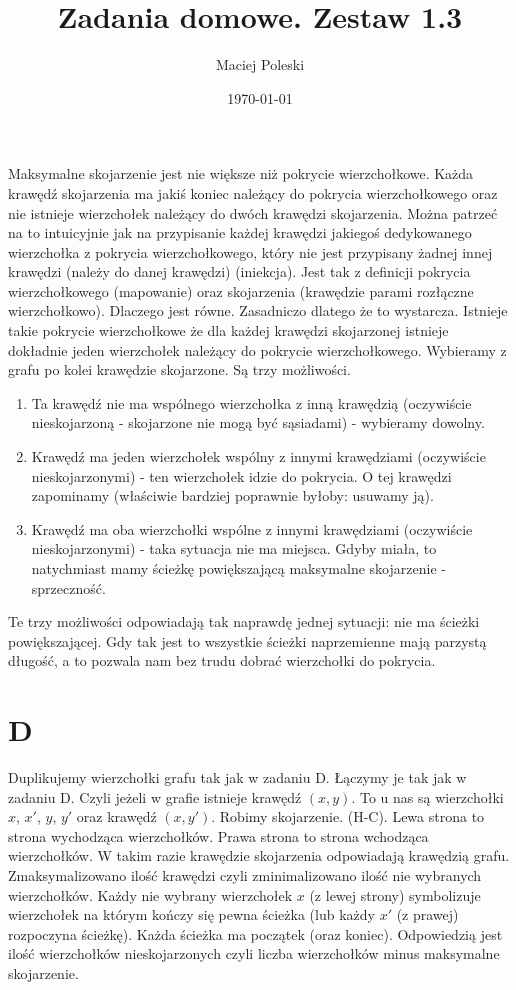 \documentclass[a4paper,12pt]{article}
\title{Zadania domowe. Zestaw 1.3}
\author{Maciej Poleski}
\date{\today}
\begin{document}
\maketitle

\newpage

\section{}
Maksymalne skojarzenie jest nie większe niż pokrycie wierzchołkowe. Każda krawędź skojarzenia ma jakiś koniec należący do pokrycia wierzchołkowego oraz nie istnieje wierzchołek należący do dwóch krawędzi skojarzenia. Można patrzeć na to intuicyjnie jak na przypisanie każdej krawędzi jakiegoś dedykowanego wierzchołka z pokrycia wierzchołkowego, który nie jest przypisany żadnej innej krawędzi (należy do danej krawędzi) (iniekcja). Jest tak z definicji pokrycia wierzchołkowego (mapowanie) oraz skojarzenia (krawędzie parami rozłączne wierzchołkowo). Dlaczego jest równe. Zasadniczo dlatego że to wystarcza. Istnieje takie pokrycie wierzchołkowe że dla każdej krawędzi skojarzonej istnieje dokładnie jeden wierzchołek należący do pokrycie wierzchołkowego. Wybieramy z grafu po kolei krawędzie skojarzone. Są trzy możliwości.
\begin{enumerate}
 \item Ta krawędź nie ma wspólnego wierzchołka z inną krawędzią (oczywiście nieskojarzoną - skojarzone nie mogą być sąsiadami) - wybieramy dowolny.
 \item Krawędź ma jeden wierzchołek wspólny z innymi krawędziami (oczywiście nieskojarzonymi) - ten wierzchołek idzie do pokrycia. O tej krawędzi zapominamy (właściwie bardziej poprawnie byłoby: usuwamy ją).
 \item Krawędź ma oba wierzchołki wspólne z innymi krawędziami (oczywiście nieskojarzonymi) - taka sytuacja nie ma miejsca. Gdyby miała, to natychmiast mamy ścieżkę powiększającą maksymalne skojarzenie - sprzeczność.
\end{enumerate}
Te trzy możliwości odpowiadają tak naprawdę jednej sytuacji: nie ma ścieżki powiększającej. Gdy tak jest to wszystkie ścieżki naprzemienne mają parzystą długość, a to pozwala nam bez trudu dobrać wierzchołki do pokrycia.
 
\section{D}
Duplikujemy wierzchołki grafu tak jak w zadaniu D. Łączymy je tak jak w zadaniu D. Czyli jeżeli w grafie istnieje krawędź $(x,y)$. To u nas są wierzchołki $x$, $x'$, $y$, $y'$ oraz krawędź $(x,y')$.
Robimy skojarzenie. (H-C). Lewa strona to strona wychodząca wierzchołków. Prawa strona to strona wchodząca wierzchołków. W takim razie krawędzie skojarzenia odpowiadają krawędzią grafu. Zmaksymalizowano ilość krawędzi czyli zminimalizowano ilość nie wybranych wierzchołków. Każdy nie wybrany wierzchołek $x$ (z lewej strony) symbolizuje wierzchołek na którym kończy się pewna ścieżka (lub każdy $x'$ (z prawej) rozpoczyna ścieżkę). Każda ścieżka ma początek (oraz koniec). Odpowiedzią jest ilość wierzchołków nieskojarzonych czyli liczba wierzchołków minus maksymalne skojarzenie.
\section{}
\end{document}
